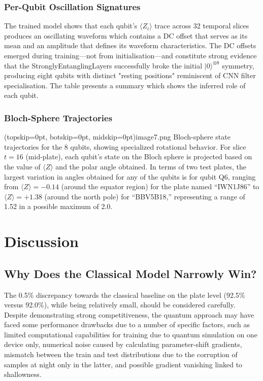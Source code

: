 \documentclass{ieeeaccess}
\begin{document}
\subsubsection{Per-Qubit Oscillation Signatures}
The trained model shows that each qubit's $\langle Z_i \rangle$ trace across 32 temporal slices produces an oscillating waveform which contains a DC offset that serves as its mean and an amplitude that defines its waveform characteristics. The DC offsets emerged during training---not from initialisation---and constitute strong evidence that the StronglyEntanglingLayers successfully broke the initial $|0\rangle^{\otimes 8}$ symmetry, producing eight qubits with distinct "resting positions" reminiscent of CNN filter specialisation. The table presents a summary which shows the inferred role of each qubit.

\subsubsection{Bloch-Sphere Trajectories}
\Figure[htbp](topskip=0pt, botskip=0pt, midskip=0pt){image7.png}
{Bloch-sphere state trajectories for the 8 qubits, showing specialized rotational behavior.\label{fig:bloch}}
For slice $t = 16$ (mid-plate), each qubit’s state on the Bloch sphere is projected based on the value of $\langle Z \rangle$ and the polar angle obtained. In terms of two test plates, the largest variation in angles obtained for any of the qubits is for qubit Q6, ranging from $\langle Z \rangle = -0.14$ (around the equator region) for the plate named ``IWN1J86'' to $\langle Z \rangle = +1.38$ (around the north pole) for ``BBV5B18,'' representing a range of 1.52 in a possible maximum of 2.0.

\section{Discussion}

\subsection{Why Does the Classical Model Narrowly Win?}
The 0.5\% discrepancy towards the classical baseline on the plate level (92.5\% versus 92.0\%), while being relatively small, should be considered carefully. Despite demonstrating strong competitiveness, the quantum approach may have faced some performance drawbacks due to a number of specific factors, such as limited computational capabilities for training due to quantum simulation on one device only, numerical noise caused by calculating parameter-shift gradients, mismatch between the train and test distributions due to the corruption of samples at night only in the latter, and possible gradient vanishing linked to shallowness. 
\end{document}
